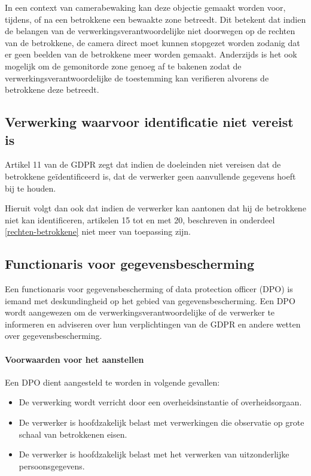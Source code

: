 In een context van camerabewaking kan deze objectie gemaakt worden voor, tijdens, of na een betrokkene een bewaakte zone betreedt. Dit betekent dat indien de belangen van de verwerkingsverantwoordelijke niet doorwegen op de rechten van de betrokkene, de camera direct moet kunnen stopgezet worden zodanig dat er geen beelden van de betrokkene meer worden gemaakt. Anderzijds is het ook mogelijk om de gemonitorde zone genoeg af te bakenen zodat de verwerkingsverantwoordelijke de toestemming kan verifieren alvorens de betrokkene deze betreedt. \autocite{edpb2019guidelines}


\subsection{Verwerking waarvoor identificatie niet vereist is}
Artikel 11 van de GDPR zegt dat indien de doeleinden niet vereisen dat de betrokkene geïdentificeerd is, dat de verwerker geen aanvullende gegevens hoeft bij te houden.
\par
Hieruit volgt dan ook dat indien de verwerker kan aantonen dat hij de betrokkene niet kan identificeren, artikelen 15 tot en met 20, beschreven in onderdeel \ref{rechten-betrokkene} niet meer van toepassing zijn.

\subsection{Functionaris voor gegevensbescherming}
Een functionaris voor gegevensbescherming of data protection officer (DPO) is iemand met deskundingheid op het gebied van gegevensbescherming. Een DPO wordt aangewezen om de verwerkingsverantwoordelijke of de verwerker te informeren en adviseren over hun verplichtingen van de GDPR en andere wetten over gegevensbescherming.

\paragraph{Voorwaarden voor het aanstellen}
Een DPO dient aangesteld te worden in volgende gevallen:
\begin{itemize}
	\item De verwerking wordt verricht door een overheidsinstantie of overheidsorgaan.
	\item De verwerker is hoofdzakelijk belast met verwerkingen die observatie op grote schaal van betrokkenen eisen.
	\item De verwerker is hoofdzakelijk belast met het verwerken van uitzonderlijke persoonsgegevens.
\end{itemize}


